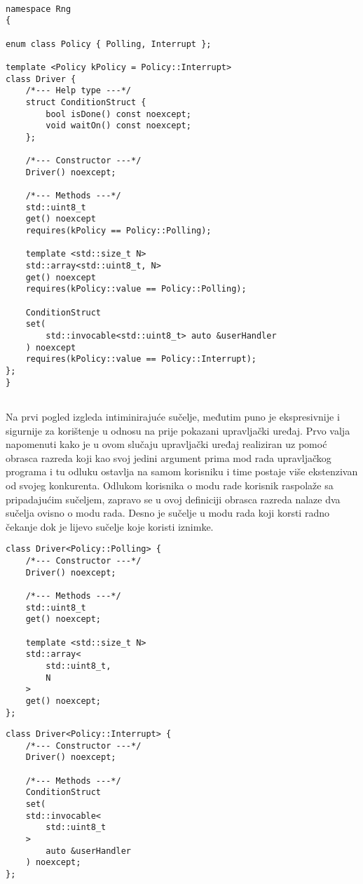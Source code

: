 \begin{lstlisting}

namespace Rng
{

enum class Policy { Polling, Interrupt };

template <Policy kPolicy = Policy::Interrupt>
class Driver {
    /*--- Help type ---*/
    struct ConditionStruct {
        bool isDone() const noexcept;
        void waitOn() const noexcept;
    };

    /*--- Constructor ---*/
    Driver() noexcept;

    /*--- Methods ---*/
    std::uint8_t 
    get() noexcept 
    requires(kPolicy == Policy::Polling);
    
    template <std::size_t N>
    std::array<std::uint8_t, N> 
    get() noexcept 
    requires(kPolicy::value == Policy::Polling);

    ConditionStruct 
    set(
        std::invocable<std::uint8_t> auto &userHandler
    ) noexcept
    requires(kPolicy::value == Policy::Interrupt);
};
}
              
\end{lstlisting}
Na prvi pogled izgleda intiminirajuće sučelje, međutim puno je ekspresivnije i sigurnije za korištenje u odnosu na prije pokazani upravljački uređaj. Prvo valja napomenuti kako je u ovom slučaju upravljački uređaj realiziran uz pomoć obrasca razreda koji kao svoj jedini argument prima mod rada upravljačkog programa i tu odluku ostavlja na samom korisniku i time postaje više ekstenzivan od svojeg konkurenta. Odlukom korisnika o modu rade korisnik raspolaže sa pripadajućim sučeljem, zapravo se u ovoj definiciji obrasca razreda nalaze dva sučelja ovisno o modu rada. Desno je sučelje u modu rada koji korsti radno čekanje dok je lijevo sučelje koje koristi iznimke.
\pagebreak
\begin{multicols}{2}
\lstset{language=C, tabsize=2, frame=single, breaklines=true, showstringspaces=false, basicstyle=\small}
\begin{lstlisting}    
class Driver<Policy::Polling> {
    /*--- Constructor ---*/
    Driver() noexcept;

    /*--- Methods ---*/
    std::uint8_t 
    get() noexcept;
    
    template <std::size_t N>
    std::array<
        std::uint8_t, 
        N
    > 
    get() noexcept;
};
\end{lstlisting}
\columnbreak
\lstset{language=C++, tabsize=1, frame=single, breaklines=true, showstringspaces=false, basicstyle=\small}
\begin{lstlisting}    
class Driver<Policy::Interrupt> {
    /*--- Constructor ---*/
    Driver() noexcept;

    /*--- Methods ---*/
    ConditionStruct 
    set(
    std::invocable<
        std::uint8_t
    >
        auto &userHandler
    ) noexcept;
};
\end{lstlisting}
\end{multicols}
